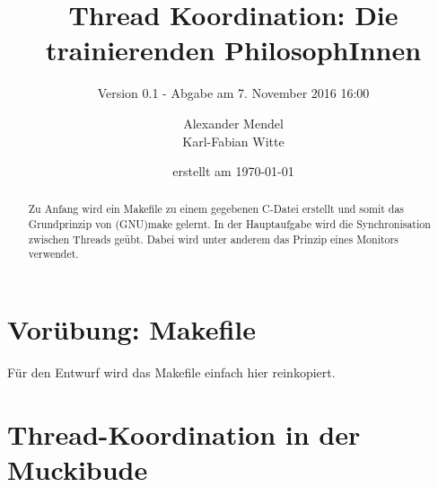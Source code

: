 \documentclass[
   draft=false
  ,paper=a4
  ,twoside=false
  ,fontsize=11pt
  ,headsepline
  ,BCOR10mm
  ,DIV11
  ,parskip=full+
]{scrartcl} %
\begin{document}
\titlehead{Betriebsystene WS 2016 Praktikum 02}%
\subject{BS Praktikumsaufgabe 02}
\title{Thread Koordination: Die trainierenden PhilosophInnen}
\subtitle{Version 0.1 - Abgabe am 7. November 2016 16:00}
\author{Alexander Mendel \\ Karl-Fabian Witte}
\date{erstellt am \today}%
\maketitle%
\begin{abstract}
  Zu Anfang wird ein Makefile zu einem gegebenen C-Datei
  erstellt und somit das Grundprinzip von (GNU)make gelernt.
  In der Hauptaufgabe wird die Synchronisation zwischen Threads geübt.
  Dabei wird unter anderem das Prinzip eines Monitors verwendet.
\end{abstract}
\tableofcontents
\flushleft
\section{Vorübung: Makefile}
Für den Entwurf wird das Makefile einfach hier reinkopiert.



\section{Thread-Koordination in der Muckibude}
\end{document}

